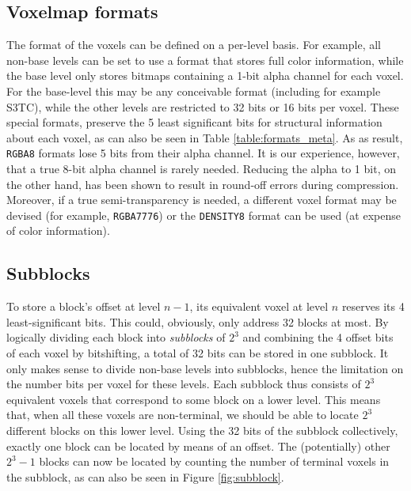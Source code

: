 \subsection{Voxelmap formats}
The format of the voxels can be defined on a per-level basis. For example, all non-base levels can be set to use a format that stores full color information, while the base level only stores bitmaps containing a 1-bit alpha channel for each voxel. For the base-level this may be any conceivable format (including for example S3TC), while the other levels are restricted to 32 bits or 16 bits per voxel. These special formats, preserve the 5 least significant bits for structural information about each voxel, as can also be seen in Table \ref{table:formats_meta}. As as result, \texttt{RGBA8} formats lose 5 bits from their alpha channel. It is our experience, however, that a true 8-bit alpha channel is rarely needed. Reducing the alpha to 1 bit, on the other hand, has been shown to result in round-off errors during compression. Moreover, if a true semi-transparency is needed, a different voxel format may be devised (for example, \texttt{RGBA7776}) or the \texttt{DENSITY8} format can be used (at expense of color information).

\subsection{Subblocks} \label{sec:subblocks}
To store a block's offset at level $n-1$, its equivalent voxel at level $n$ reserves its 4 least-significant bits. This could, obviously, only address 32 blocks at most. By logically dividing each block into \emph{subblocks} of $2^3$ and combining the 4 offset bits of each voxel by bitshifting, a total of 32 bits can be stored in one subblock. It only makes sense to divide non-base levels into subblocks, hence the limitation on the number bits per voxel for these levels. Each subblock thus consists of $2^3$ equivalent voxels that correspond to some block on a lower level. This means that, when all these voxels are non-terminal, we should be able to locate $2^3$ different blocks on this lower level. Using the 32 bits of the subblock collectively, exactly one block can be located by means of an offset. The (potentially) other $2^3-1$ blocks can now be located by counting the number of terminal voxels in the subblock, as can also be seen in Figure \ref{fig:subblock}.

